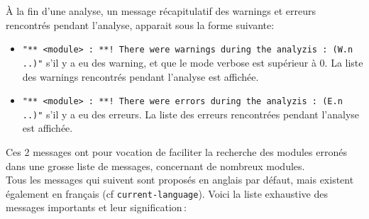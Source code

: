 \`{A} la fin d'une analyse, un message r\'{e}capitulatif des warnings et
erreurs rencontr\'{e}s pendant l'analyse, apparait sous la forme
suivante:
\begin{itemize}
\item {\tt "** <module> : **! There were warnings during the analyzis : (W.n ..)"}
s'il y a eu des warning, et que le mode verbose est sup\'{e}rieur \`{a} 0.
La liste des warnings rencontr\'{e}s pendant l'analyse est affich\'{e}e.
\item {\tt "** <module> : **! There were errors during the analyzis : (E.n ..)"}
s'il y a eu des erreurs. La liste des erreurs rencontr\'{e}es pendant
l'analyse est affich\'{e}e. 
\end{itemize}
Ces 2 messages ont pour vocation de faciliter la recherche des modules
erron\'{e}s dans une grosse liste de messages, concernant de nombreux
modules. \\
Tous les messages qui suivent sont propos\'{e}s en anglais par d\'{e}faut,
mais existent \'{e}galement en fran\c{c}ais (cf {\tt current-language}).
Voici la liste exhaustive des messages importants et leur
signification\,:

